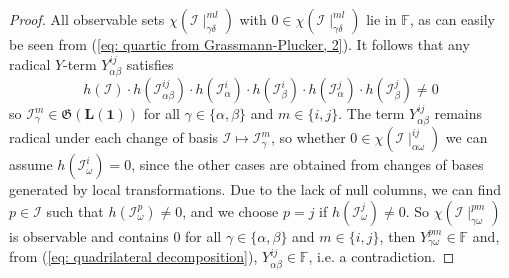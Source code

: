 \documentclass[10pt]{article}
\theoremstyle{remark}%
\theoremstyle{definition}%
\begin{document}
\begin{proof}
All observable sets $\chi(\mathcal{I}\mid_{\gamma\delta}^{ml})$ with $0\in\chi(\mathcal{I}\mid_{\gamma\delta}^{ml})$ lie in $\mathbb{F}$, as can easily be seen from (\ref{eq: quartic from Grassmann-Plucker, 2}). 
It follows that any radical $Y$-term $Y_{\alpha\beta}^{ij}$ satisfies 
 \begin{equation}
h(\mathcal{I})\cdot h(\mathcal{I}_{\alpha\beta}^{ij})\cdot h(\mathcal{I}_{\alpha}^{i})\cdot h(\mathcal{I}_{\beta}^{i})\cdot h(\mathcal{I}_{\alpha}^{j})\cdot h(\mathcal{I}_{\beta}^{j})\neq0
\label{eq: all 3 terms non-vanishing}
 \end{equation}
so $\mathcal{I}_{\gamma}^{m}\in\mathfrak{G}(\mathbf{L}(\mathbf{1}))$ for all $\gamma\in\{\alpha,\beta\}$ and $m\in\{i,j\}$. The term $Y_{\alpha\beta}^{ij}$ remains radical under each change of basis $\mathcal{I}\mapsto\mathcal{I}_{\gamma}^{m}$, so whether $0\in\chi(\mathcal{I}\mid_{\alpha\omega}^{ij})$ we can assume $h(\mathcal{I}_{\omega}^{i})=0$, since the other cases are obtained from changes of bases generated by local transformations. Due to the lack of null columns, we can find $p\in\mathcal{I}$ such that $h(\mathcal{I}_{\omega}^{p})\neq 0$, and we choose $p=j$ if $h(\mathcal{I}_{\omega}^{j})\neq 0$. So $\chi(\mathcal{I}\mid_{\gamma\omega}^{pm})$ is observable and contains $0$ for all $\gamma\in\{\alpha,\beta\}$ and $m\in\{i,j\}$, then $Y_{\gamma\omega}^{pm}\in\mathbb{F}$ and, from (\ref{eq: quadrilateral decomposition}), $Y_{\alpha\beta}^{ij}\in\mathbb{F}$, i.e. a contradiction. 
\end{proof}
\end{document}
